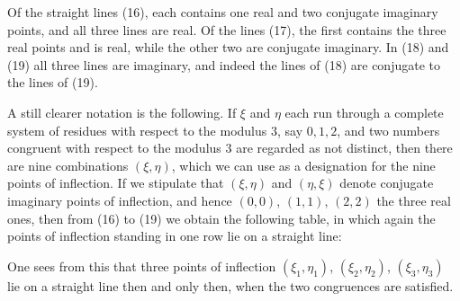 

Of the straight lines (16), each contains one real and two
conjugate imaginary points, and all three lines are real. Of the
lines (17), the first contains the three real points and is real,
while the other two are conjugate imaginary. In (18) and (19)
all three lines are imaginary, and indeed the lines of (18) are
conjugate to the lines of (19).

A still clearer notation is the following. If
$\xi$ and $\eta$ each run through a complete system of residues with respect to the modulus 3,
say $0, 1, 2$, and two numbers congruent with respect to the modulus 3
are regarded as not distinct, then there are nine
combinations $(\xi, \eta)$, which we can use as a designation for the nine
points of inflection. If we stipulate that $(\xi, \eta)$ and
$(\eta, \xi)$ denote conjugate imaginary points of inflection, and hence $(0, 0)$, $(1, 1)$, $(2, 2)$
the three real ones, then from (16) to (19) we obtain the following
 table, in which again the points of inflection standing in one row
 lie on a straight line:

One sees from this that three points of inflection $(\xi_1, \eta_1)$, $(\xi_2, \eta_2)$,
$(\xi_3, \eta_3)$ lie on a straight line then and only then, when
the two congruences
are satisfied.
